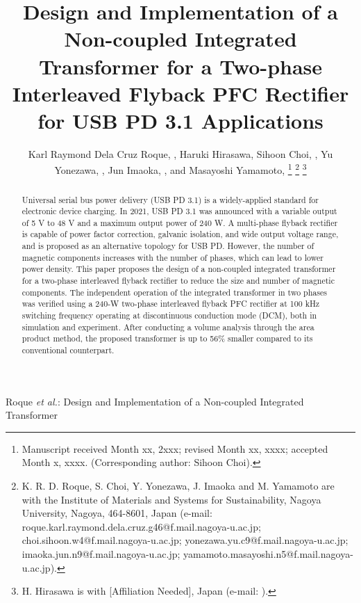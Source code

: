 \documentclass[lettersize,journal]{IEEEtran}
\begin{document}
\title{Design and Implementation of a Non-coupled Integrated Transformer for a Two-phase Interleaved Flyback PFC Rectifier for USB PD 3.1 Applications}

\author{Karl Raymond Dela Cruz Roque, , Haruki Hirasawa, Sihoon Choi, , Yu Yonezawa, , Jun Imaoka, , and Masayoshi Yamamoto, 
\thanks{Manuscript received Month xx, 2xxx; revised Month xx, xxxx; accepted Month x, xxxx. (Corresponding author: Sihoon Choi).}
\thanks{K. R. D. Roque, S. Choi, Y. Yonezawa, J. Imaoka and M. Yamamoto are with the Institute of Materials and Systems for Sustainability, Nagoya University, Nagoya, 464-8601, Japan (e-mail: roque.karl.raymond.dela.cruz.g46@f.mail.nagoya-u.ac.jp; choi.sihoon.w4@f.mail.nagoya-u.ac.jp; yonezawa.yu.c9@f.mail.nagoya-u.ac.jp; imaoka.jun.n9@f.mail.nagoya-u.ac.jp; yamamoto.masayoshi.n5@f.mail.nagoya-u.ac.jp).}
\thanks{H. Hirasawa is with [Affiliation Needed], Japan (e-mail: ).}}

%
{Roque \MakeLowercase{\textit{et al.}}: Design and Implementation of a Non-coupled Integrated Transformer}

\maketitle

\begin{abstract}
Universal serial bus power delivery (USB PD 3.1) is a widely-applied standard for electronic device charging. In 2021, USB PD 3.1 was announced with a variable output of 5 V to 48 V and a maximum output power of 240 W. A multi-phase flyback rectifier is capable of power factor correction, galvanic isolation, and wide output voltage range, and is proposed as an alternative topology for USB PD. However, the number of magnetic components increases with the number of phases, which can lead to lower power density. This paper proposes the design of a non-coupled integrated transformer for a two-phase interleaved flyback rectifier to reduce the size and number of magnetic components. The independent operation of the integrated transformer in two phases was verified using a 240-W two-phase interleaved flyback PFC rectifier at 100 kHz switching frequency operating at discontinuous conduction mode (DCM), both in simulation and experiment. After conducting a volume analysis through the area product method, the proposed transformer is up to 56\% smaller compared to its conventional counterpart.
\end{abstract}
\end{document}

